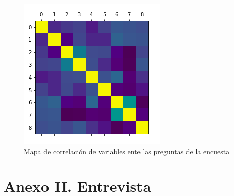             \begin{figure}[H]
                \centering
                \includegraphics[width=.5\linewidth]{Latex/Classes/Imagenes/correlacion.png}
                \caption{Mapa de correlación de variables ente las preguntas de la encuesta}
            \end{figure}
    
    \newpage
    \section{Anexo II. Entrevista }
